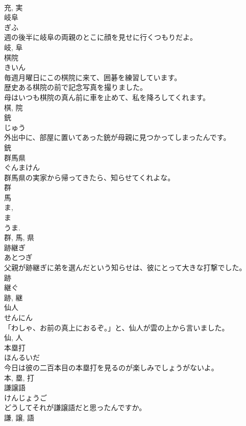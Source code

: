 \documentclass[8pt]{extreport}
\begin{document}
\begin{CJK}{UTF8}{min}
\\	充, 実	
\\	岐阜	
\\	ぎふ	
\\	週の後半に岐阜の両親のとこに顔を見せに行くつもりだよ。	
\\	岐, 阜	
\\	棋院	
\\	きいん	
\\	毎週月曜日にこの棋院に来て、囲碁を練習しています。	
\\	歴史ある棋院の前で記念写真を撮りました。	
\\	母はいつも棋院の真ん前に車を止めて、私を降ろしてくれます。	
\\	棋, 院	
\\	銃	
\\	じゅう	
\\	外出中に、部屋に置いてあった銃が母親に見つかってしまったんです。	
\\	銃	
\\	群馬県	
\\	ぐんまけん	
\\	群馬県の実家から帰ってきたら、知らせてくれよな。	
\\	群 
\\	馬 
\\	ま, 
\\	ま 
\\	うま. 
\\	群, 馬, 県	
\\	跡継ぎ	
\\	あとつぎ	
\\	父親が跡継ぎに弟を選んだという知らせは、彼にとって大きな打撃でした。	
\\	跡 
\\	継ぐ 
\\	跡, 継	
\\	仙人	
\\	せんにん	
\\	「わしゃ、お前の真上におるぞ。」と、仙人が雲の上から言いました。	
\\	仙, 人	
\\	本塁打	
\\	ほんるいだ	
\\	今日は彼の二百本目の本塁打を見るのが楽しみでしょうがないよ。	
\\	本, 塁, 打	
\\	謙譲語	
\\	けんじょうご	
\\	どうしてそれが謙譲語だと思ったんですか。	
\\	謙, 譲, 語	

\end{CJK}
\end{document}
